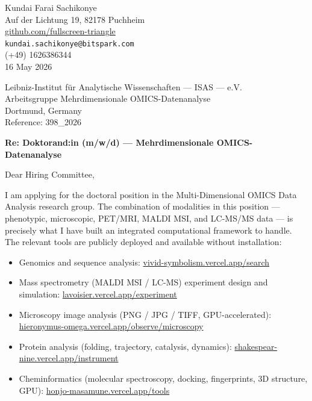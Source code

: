 \documentclass[12pt,a4paper]{article}
\begin{document}
\begin{flushright}
Kundai Farai Sachikonye \\
Auf der Lichtung 19, 82178 Puchheim \\
\href{https://github.com/fullscreen-triangle}{github.com/fullscreen-triangle} \\
\texttt{kundai.sachikonye@bitspark.com} \\
(+49) 1626386344 \\[6pt]
16 May 2026
\end{flushright}

\vspace{1em}

Leibniz-Institut für Analytische Wissenschaften --- ISAS --- e.V. \\
Arbeitsgruppe Mehrdimensionale OMICS-Datenanalyse \\
Dortmund, Germany \\
Reference: 398\_2026

\vspace{1.5em}

\textbf{Re: Doktorand:in (m/w/d) --- Mehrdimensionale OMICS-Datenanalyse}

\vspace{1em}

Dear Hiring Committee,

I am applying for the doctoral position in the Multi-Dimensional OMICS Data Analysis
research group. The combination of modalities in this position --- phenotypic,
microscopic, PET/MRI, MALDI MSI, and LC-MS/MS data --- is precisely what I have
built an integrated computational framework to handle. The relevant tools are publicly
deployed and available without installation:

\begin{itemize}
  \item Genomics and sequence analysis:
    \href{https://vivid-symbolism.vercel.app/search}{vivid-symbolism.vercel.app/search}
  \item Mass spectrometry (MALDI MSI / LC-MS) experiment design and simulation:
    \href{https://lavoisier.vercel.app/experiment}{lavoisier.vercel.app/experiment}
  \item Microscopy image analysis (PNG / JPG / TIFF, GPU-accelerated):
    \href{https://hieronymus-omega.vercel.app/observe/microscopy}{hieronymus-omega.vercel.app/observe/microscopy}
  \item Protein analysis (folding, trajectory, catalysis, dynamics):
    \href{https://shakespear-nine.vercel.app/instrument}{shakespear-nine.vercel.app/instrument}
  \item Cheminformatics (molecular spectroscopy, docking, fingerprints, 3D structure, GPU):
    \href{https://honjo-masamune.vercel.app/tools}{honjo-masamune.vercel.app/tools}
\end{itemize}
\end{document}
